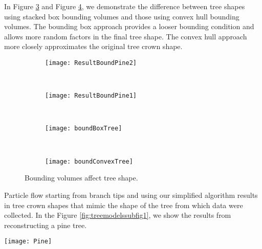 In Figure \ref{fig:boxTree} and Figure \ref{fig:convextTree}, we demonstrate the difference between tree shapes using stacked box bounding volumes and those using convex hull bounding volumes. The bounding box approach provides a looser bounding condition and allows more random factors in the final tree shape. The convex hull approach more closely approximates the original tree crown shape.

\begin{figure}
\centering
        \begin{subfigure}[b]{0.33\textwidth}
                \centering
                \texttt{[image: ResultBoundPine2]}
                \caption{}
                \label{fig:boundboxsizesubfig1}
        \end{subfigure}
        ~
        \begin{subfigure}[b]{0.34\textwidth}
                \centering
                \texttt{[image: ResultBoundPine1]}
                \caption{}
                \label{fig:boundboxsizesubfig2}
        \end{subfigure}
        ~
        \begin{subfigure}[b]{0.34\textwidth}
                \centering
                \texttt{[image: boundBoxTree]}
                \caption{}
                \label{fig:boxTree}
        \end{subfigure}
        ~
        \begin{subfigure}[b]{0.33\textwidth}
				        \centering
				        \texttt{[image: boundConvexTree]}
				        \caption{}
				        \label{fig:convextTree}
        \end{subfigure}
\caption{Bounding volumes affect tree shape.}
\label{fig:boxConvex}
\end{figure}

Particle flow starting from branch tips and using our simplified algorithm results in tree crown shapes that mimic the shape of the tree from which data were collected. In the Figure \ref{fig:treemodelssubfig1}, we show the results from reconstructing a pine tree. 

\begin{figure*}[!t]
\centering
\texttt{[image: Pine]}
\caption[Pine tree model.]{Pine tree model. 3D tree models created from branch tip positions are similar to the shapes of the trees from which branch tip positions were collected.}
\label{fig:treemodelssubfig1}
\end{figure*}

